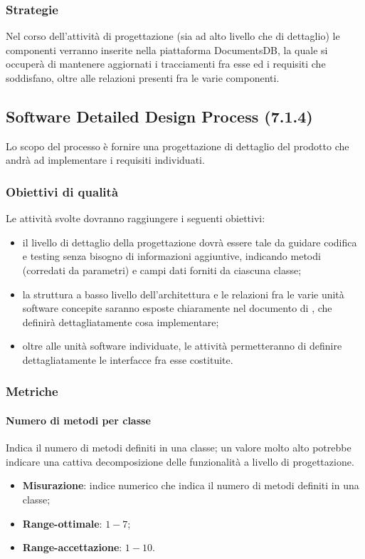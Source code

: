 \subsubsection{Strategie}
Nel corso dell'attività di progettazione (sia ad alto livello che di dettaglio) le componenti verranno inserite nella piattaforma DocumentsDB, la quale si occuperà di mantenere aggiornati i tracciamenti fra esse ed i requisiti che soddisfano, oltre alle relazioni presenti fra le varie componenti.
\subsection{Software Detailed Design Process (7.1.4)}
\label{sySoDetailDesign}
Lo scopo del processo è fornire una progettazione di dettaglio del prodotto che andrà ad implementare i requisiti individuati.
\subsubsection{Obiettivi di qualità}
Le attività svolte dovranno raggiungere i seguenti obiettivi:
\begin{itemize}
\item il livello di dettaglio della progettazione dovrà essere tale da guidare codifica e testing senza bisogno di informazioni aggiuntive, indicando metodi (corredati da parametri) e campi dati forniti da ciascuna classe;
\item la struttura a basso livello dell'architettura e le relazioni fra le varie unità software concepite saranno esposte chiaramente nel documento di \textit{\DDP}, che definirà dettagliatamente cosa implementare;
\item oltre alle unità software individuate, le attività permetteranno di definire dettagliatamente le interfacce fra esse costituite.
\end{itemize}
\subsubsection{Metriche}
\paragraph{Numero di metodi per classe}
\label{numMetodiClasse}
Indica il numero di metodi definiti in una classe; un valore molto alto potrebbe indicare una cattiva decomposizione delle funzionalità a livello di progettazione.
\begin{itemize}
\item \textbf{Misurazione}: indice numerico che indica il numero di metodi definiti in una classe;
\item \textbf{Range-ottimale}: $1 - 7$;
\item \textbf{Range-accettazione}: $1 - 10$.
\end{itemize}
